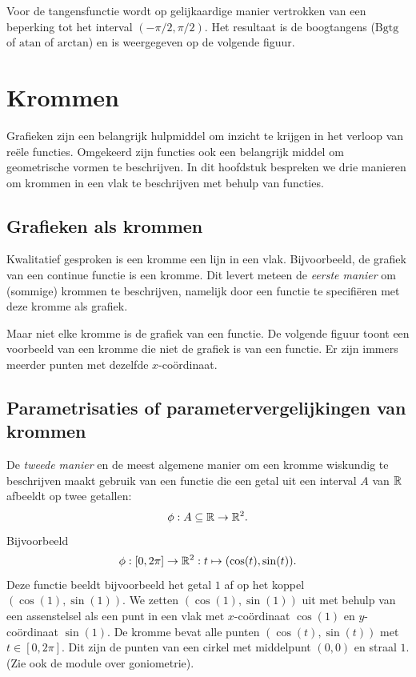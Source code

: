 \documentclass{ximera}
\begin{document}
\newpage


Voor de tangensfunctie wordt op gelijkaardige manier vertrokken van
een beperking tot het interval $(-\pi/2,\pi/2)$. Het resultaat is de
boogtangens ($\mbox{Bgtg}$ of $\mbox{atan}$ of $\mbox{arctan}$) en is
weergegeven op de volgende figuur.


\newpage

\section{Krommen}

\label{seckrom}
Grafieken zijn een belangrijk hulpmiddel om inzicht te krijgen in het
verloop van re\"ele functies. Omgekeerd zijn functies ook een
belangrijk middel om geometrische vormen te beschrijven. In dit
hoofdstuk bespreken we drie manieren om krommen in een vlak te
beschrijven met behulp van functies.

\subsection{Grafieken als krommen}


Kwalitatief gesproken is een kromme een lijn in een
vlak. Bijvoorbeeld, de grafiek van een continue functie is een
kromme. Dit levert meteen de {\em eerste manier} om (sommige) krommen
te beschrijven, namelijk door een functie te specifi\"eren met deze
kromme als grafiek.

Maar niet elke kromme is de grafiek van een functie. De volgende figuur
toont een voorbeeld van een kromme die niet de grafiek is van een
functie. Er zijn immers meerder punten met dezelfde $x$-co\"ordinaat.



\subsection{Parametrisaties of parametervergelijkingen van krommen}

De {\em tweede manier} en de meest algemene manier om een kromme
wiskundig te beschrijven maakt gebruik van een functie die een getal
uit een interval $A$ van $\mathbb{R}$ afbeeldt op twee getallen:
\[
\phi:A\subseteq\mathbb{R}\rightarrow\mathbb{R}^2.
\]
Bijvoorbeeld
\[
\phi: [0,2\pi] \rightarrow \mathbb{R}^2: t \mapsto (\cos(t),\sin(t)).
\]
Deze functie beeldt bijvoorbeeld het getal $1$ af op het koppel
$(\cos(1),\sin(1))$. We zetten $(\cos(1),\sin(1))$ uit met behulp van een
assenstelsel als een punt in een vlak met $x$-co\"ordinaat $\cos(1)$ en
$y$-co\"ordinaat $\sin(1)$. De kromme bevat alle punten
$(\cos(t),\sin(t))$ met $t\in[0,2\pi]$. Dit zijn de punten van een cirkel
met middelpunt $(0,0)$ en straal $1$. (Zie ook de module over goniometrie).
\end{document}

